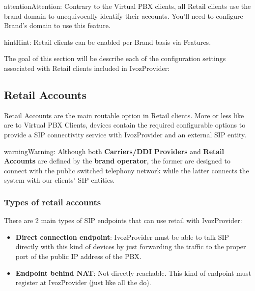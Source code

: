 \documentclass[letterpaper,10pt,english]{sphinxmanual}
\begin{document}
\begin{notice}{attention}{Attention:}
Contrary to the Virtual PBX clients, all Retail clients use the
brand domain to unequivocally identify their accounts. You'll need to configure
Brand's domain to use this feature.
\end{notice}

\begin{notice}{hint}{Hint:}
Retail clients can be enabled per Brand basis via Features.
\end{notice}

The goal of this section will be describe each of the configuration settings
associated with Retail clients included in IvozProvider:


\subsection{Retail Accounts}
\label{administration_portal/client/retail/retail_accounts::doc}\label{administration_portal/client/retail/retail_accounts:retail-accounts}\label{administration_portal/client/retail/retail_accounts:id1}
Retail Accounts are the main routable option in Retail clients.
More or less like {\hyperref[administration_portal/client/vpbx/routing_endpoints/friends/index:friends]{}} are to Virtual PBX Clients, devices
contain the required configurable options to provide a SIP connectivity
service with IvozProvider and an external SIP entity.

\begin{notice}{warning}{Warning:}
Although both \textbf{Carriers/DDI Providers} and \textbf{Retail Accounts} are defined by the
\textbf{brand operator}, the former are designed to connect with the public switched telephony network
while the latter connects the system with our clients' SIP entities.
\end{notice}


\subsubsection{Types of retail accounts}
\label{administration_portal/client/retail/retail_accounts:types-of-retail-accounts}
There are 2 main types of SIP endpoints that can use retail with IvozProvider:
\begin{itemize}
\item {} 
\textbf{Direct connection endpoint}: IvozProvider must be able to talk SIP directly with
this kind of devices by just forwarding the traffic to the proper port of
the public IP address of the PBX.

\item {} 
\textbf{Endpoint behind NAT}: Not directly reachable. This kind of endpoint must register at
IvozProvider (just like all the {\hyperref[administration_portal/client/vpbx/terminals:terminals]{}} do).

\end{itemize}
\end{document}

